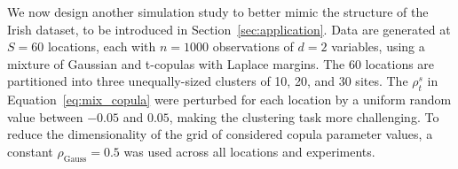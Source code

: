 \documentclass[12pt]{article}
\newcommand{\JSGa}{\mathop{\mathrm{JS}^{\mathrm{G}_{\lambda}}}\nolimits}
\newcommand{\rhou}[1]{\rho_{\text{#1}}}
\begin{document}
We now design another simulation study to better mimic the structure of the Irish dataset, to be introduced in Section~\ref{sec:application}. 
Data are generated at $S = 60$ locations, each with $n = 1000$ observations of $d = 2$ variables, using a mixture of Gaussian and t-copulas with Laplace margins. 
The 60 locations are partitioned into three unequally-sized clusters of 10, 20, and 30 sites. 
The $\rho_{t}^s$ in Equation~\eqref{eq:mix_copula} were perturbed for each location by a uniform random value between $-0.05$ and $0.05$, making the clustering task more challenging. 
To reduce the dimensionality of the grid of considered copula parameter values, a constant $\rhou{Gauss} = 0.5$ was used across all locations and experiments. 
\end{document}
